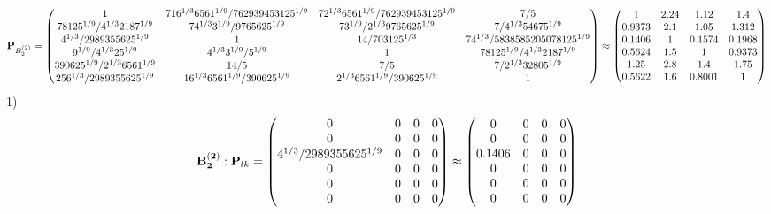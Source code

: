 \documentclass[10pt,a4paper]{article}
\begin{document}
	\[
		\bold{P}_{B_2^{(2)}} = 
		\begin{pmatrix}
			{1}{} & {{7}{16^ {1 / 3}}{6561^ {1 / 9}}} / {{762939453125^ {1 / 9}}} & {{7}{2^ {1 / 3}}{6561^ {1 / 9}}} / {{762939453125^ {1 / 9}}} & {{7}} / {{5}} \\
			{{78125^ {1 / 9}}} / {{4^ {1 / 3}}{2187^ {1 / 9}}} & {{7}{4^ {1 / 3}}{3^ {1 / 9}}} / {{9765625^ {1 / 9}}} & {{7}{3^ {1 / 9}}} / {{2^ {1 / 3}}{9765625^ {1 / 9}}} & {{7}} / {{4^ {1 / 3}}{54675^ {1 / 9}}} \\
			{{4^ {1 / 3}}} / {{2989355625^ {1 / 9}}} & {1}{} & {{14}} / {{703125^ {1 / 3}}} & {{7}{4^ {1 / 3}}} / {{5838585205078125^ {1 / 9}}} \\
			{{9^ {1 / 9}}} / {{4^ {1 / 3}}{25^ {1 / 9}}} & {{4^ {1 / 3}}{3^ {1 / 9}}} / {{5^ {1 / 9}}} & {1}{} & {{78125^ {1 / 9}}} / {{4^ {1 / 3}}{2187^ {1 / 9}}} \\
			{{390625^ {1 / 9}}} / {{2^ {1 / 3}}{6561^ {1 / 9}}} & {{14}} / {{5}} & {{7}} / {{5}} & {{7}} / {{2^ {1 / 3}}{32805^ {1 / 9}}} \\
			{{256^ {1 / 3}}} / {{2989355625^ {1 / 9}}} & {{16^ {1 / 3}}{6561^ {1 / 9}}} / {{390625^ {1 / 9}}} & {{2^ {1 / 3}}{6561^ {1 / 9}}} / {{390625^ {1 / 9}}} & {1}{} \\
		\end{pmatrix}
		\approx
		\begin{pmatrix}
			1        & 2.24     & 1.12     & 1.4      \\
			0.9373   & 2.1      & 1.05     & 1.312    \\
			0.1406   & 1        & 0.1574   & 0.1968   \\
			0.5624   & 1.5      & 1        & 0.9373   \\
			1.25     & 2.8      & 1.4      & 1.75     \\
			0.5622   & 1.6      & 0.8001   & 1        \\
		\end{pmatrix}
	\]
	1)
	\[
		\bold{B_2^{(2)}}: \bold{P}_{lk} = 
		\begin{pmatrix}
			{{0}}{} & {{0}}{} & {{0}}{} & {{0}}{} \\
			{{0}}{} & {{0}}{} & {{0}}{} & {{0}}{} \\
			{{4^ {1 / 3}}} / {{2989355625^ {1 / 9}}} & {{0}}{} & {{0}}{} & {{0}}{} \\
			{{0}}{} & {{0}}{} & {{0}}{} & {{0}}{} \\
			{{0}}{} & {{0}}{} & {{0}}{} & {{0}}{} \\
			{{0}}{} & {{0}}{} & {{0}}{} & {{0}}{} \\
		\end{pmatrix}
		\approx
		\begin{pmatrix}
			0        & 0        & 0        & 0        \\
			0        & 0        & 0        & 0        \\
			0.1406   & 0        & 0        & 0        \\
			0        & 0        & 0        & 0        \\
			0        & 0        & 0        & 0        \\
			0        & 0        & 0        & 0        \\
		\end{pmatrix}
	\]
\end{document}
